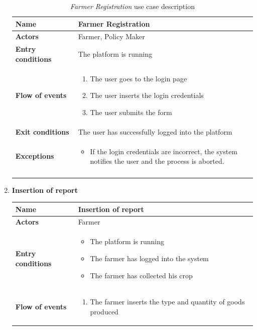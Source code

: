 \documentclass[10pt]{article}
\begin{document}
\begin{enumerate}[label=\textbf{UC\arabic*}]
\begin{longtable}{p{0.26\linewidth}p{0.75\linewidth}}
        \toprule
        \textbf{Name} & \textbf{Farmer Registration} \\
        \midrule
        \textbf{Actors} & Farmer, Policy Maker \\
        \midrule
        \textbf{Entry conditions} & The platform is running \\
        \midrule
        \textbf{Flow of events} & 
        \begin{enumerate}
            \item The user goes to the login page
            \item The user inserts the login credentials
            \item The user submits the form
        \end{enumerate} \\
        \midrule
        \textbf{Exit conditions} & The user has successfully logged into the platform\\
        \midrule
        \textbf{Exceptions} & 
        \begin{itemize}
            \item If the login credentials are incorrect, the system notifies the user and the process is aborted.
        \end{itemize} \\
        \bottomrule
        \caption{\emph{Farmer Registration} use case description}
    \end{longtable}
    \newpage
    \item \label{uc:uc4} \textbf{Insertion of report}
        \begin{longtable}{p{0.26\linewidth}p{0.75\linewidth}}
            \toprule
            \textbf{Name} & \textbf{Insertion of report} \\
            \midrule
            \textbf{Actors} & Farmer\\
            \midrule
            \textbf{Entry conditions} & 
            \begin{itemize}
                \item The platform is running
                \item The farmer has logged into the system
                \item The farmer has collected his crop
            \end{itemize}\\
            \midrule
            \textbf{Flow of events} & 
            \begin{enumerate}
                \item The farmer inserts the type and quantity of goods produced

\end{enumerate}
\end{longtable}
\end{enumerate}
\end{document}

